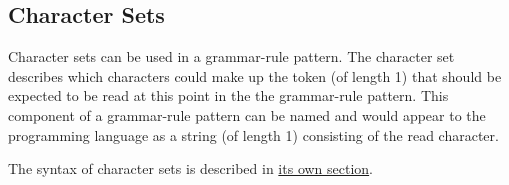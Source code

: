 
\subsection{Character Sets}
{
	Character sets can be used in a grammar-rule pattern.
	The character set describes which characters could make up the
	token (of length 1) that should be
	expected
	to be read at this point in the the grammar-rule pattern.
	This component of a grammar-rule pattern can be named and would appear to
	the programming language as a string (of length 1) consisting of
	the read character.
	
	The syntax of character sets is described in
	\hyperref[subsec:charset]{its own section}.
}
